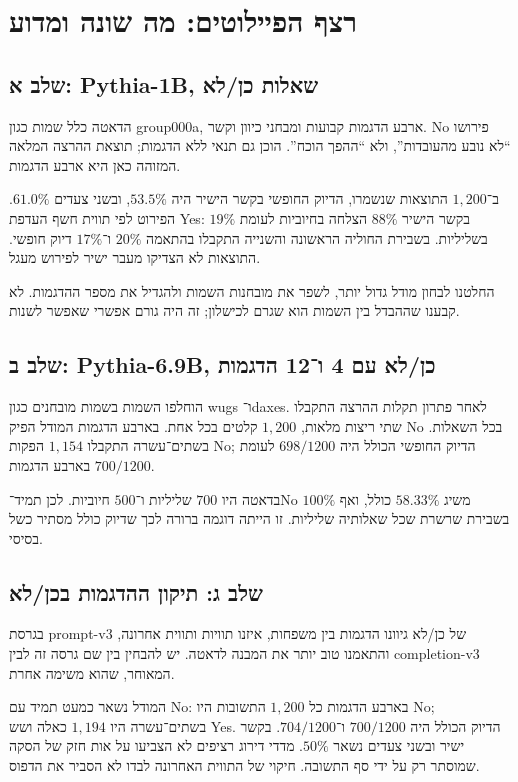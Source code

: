 \documentclass[11pt,a4paper]{article}
\newcommand{\en}[1]{\textenglish{#1}}
\begin{document}
\section{רצף הפיילוטים: מה שונה ומדוע}
\subsection{שלב א: Pythia-1B, שאלות כן/לא}
הדאטה כלל שמות כגון \en{group000a}, ארבע הדגמות קבועות ומבחני כיוון וקשר. \en{No} פירושו ``לא נובע מהעובדות'', ולא ``ההפך הוכח''. הוכן גם תנאי ללא הדגמות; תוצאת ההרצה המלאה המזוהה כאן היא ארבע הדגמות.

ב־$1{,}200$ התוצאות שנשמרו, הדיוק החופשי בקשר הישיר היה $53.5\%$, ובשני צעדים $61.0\%$. הפירוט לפי תווית חשף העדפת \en{Yes}: בקשר הישיר $88\%$ הצלחה בחיוביות לעומת $19\%$ בשליליות. בשבירת החוליה הראשונה והשנייה התקבלו בהתאמה $20\%$ ו־$17\%$ דיוק חופשי. התוצאות לא הצדיקו מעבר ישיר לפירוש מעגל.

החלטנו לבחון מודל גדול יותר, לשפר את מובחנות השמות ולהגדיל את מספר ההדגמות. לא קבענו שההבדל בין השמות הוא שגרם לכישלון; זה היה גורם אפשרי שאפשר לשנות.

\subsection{שלב ב: Pythia-6.9B, כן/לא עם 4 ו־12 הדגמות}
הוחלפו השמות בשמות מובחנים כגון \en{wugs} ו־\en{daxes}. לאחר פתרון תקלות ההרצה התקבלו שתי ריצות מלאות, $1{,}200$ קלטים בכל אחת. בארבע הדגמות המודל הפיק \en{No} בכל השאלות. בשתים־עשרה התקבלו $1{,}154$ הפקות \en{No}; הדיוק החופשי הכולל היה $698/1200$ לעומת $700/1200$ בארבע הדגמות.

בדאטה היו $700$ שליליות ו־$500$ חיוביות. לכן תמיד־\en{No} משיג $58.33\%$ כולל, ואף $100\%$ בשבירת שרשרת שכל שאלותיה שליליות. זו הייתה דוגמה ברורה לכך שדיוק כולל מסתיר כשל בסיסי.

\subsection{שלב ג: תיקון ההדגמות בכן/לא}
בגרסת \en{prompt-v3} של כן/לא גיוונו הדגמות בין משפחות, איזנו תוויות ותווית אחרונה, והתאמנו טוב יותר את המבנה לדאטה. יש להבחין בין שם גרסה זה לבין \en{completion-v3} המאוחר, שהוא משימה אחרת.

המודל נשאר כמעט תמיד עם \en{No}: בארבע הדגמות כל $1{,}200$ התשובות היו \en{No}; בשתים־עשרה היו $1{,}194$ כאלה ושש \en{Yes}. הדיוק הכולל היה $700/1200$ ו־$704/1200$. בקשר ישיר ובשני צעדים נשאר $50\%$. מדדי דירוג רציפים לא הצביעו על אות חזק של הסקה שמוסתר רק על ידי סף התשובה. חיקוי של התווית האחרונה לבדו לא הסביר את הדפוס.
\end{document}
